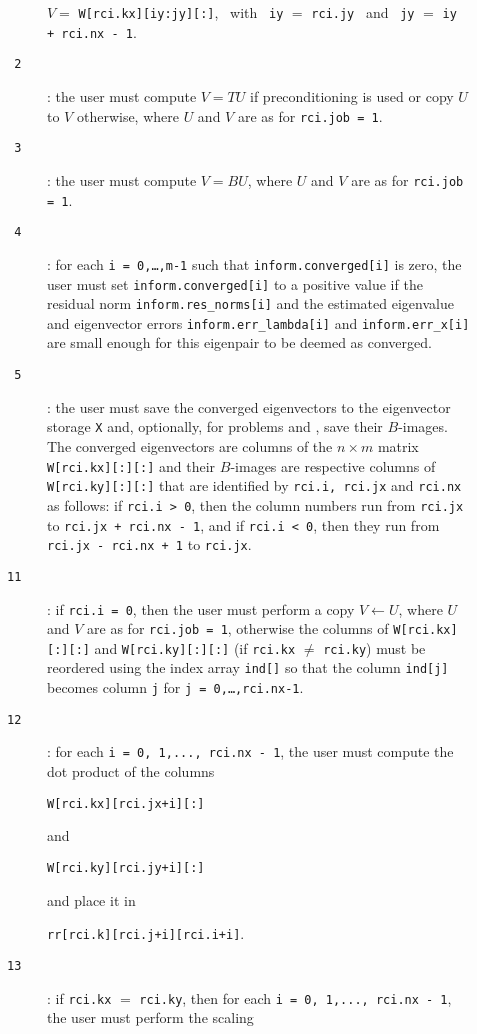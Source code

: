 \begin{description}
\begin{description}
\hspace{8mm}
$V=$ {\tt W[rci.kx][iy:jy][:]},
~with~ {\tt iy} $=$ {\tt rci.jy} 
~and~
{\tt jy} $=$ {\tt iy + rci.nx - 1}.
%
\item[\texttt{~2}]: the user must
compute $V = T U$ if preconditioning is used
or copy $U$ to $V$ otherwise,
where $U$ and $V$ are as for {\tt rci.job = 1}.
%
\item[\texttt{~3}]:
the user must compute $V = B U$,
where $U$ and $V$ are as for {\tt rci.job = 1}.
%
\item[\texttt{~4}]:
for each {\tt i = 0,\ldots,m-1}
such that {\tt inform.converged[i]} is zero,
the user must set {\tt inform.converged[i]}
to a positive value if the residual norm
{\tt inform.res\_norms[i]} and
the estimated eigenvalue and eigenvector errors
{\tt inform.err\_lambda[i]} and
{\tt inform.err\_x[i]} are small enough
for this eigenpair to be deemed as converged.
%
\item[\texttt{~5}]: the user must save the converged eigenvectors
to the eigenvector storage {\tt X}
and, optionally, 
for problems  and ,
save their $B$-images.
The converged eigenvectors are columns of the $n\times m$ matrix
{\tt W[rci.kx][:][:]} and their $B$-images are respective columns of
{\tt W[rci.ky][:][:]}
that are identified by
{\tt rci.i, rci.jx} and {\tt rci.nx}
as follows:
if {\tt rci.i > 0}, then the column numbers
run from {\tt rci.jx} to {\tt rci.jx + rci.nx - 1},
and if {\tt rci.i < 0}, then they run
from {\tt rci.jx - rci.nx + 1} to {\tt rci.jx}.
%
\item[\texttt{11}]:
if {\tt rci.i = 0}, then
the user  must perform a copy $V \leftarrow U$, 
where $U$ and $V$ are as for {\tt rci.job = 1},
otherwise the columns of {\tt W[rci.kx][:][:]}
and {\tt W[rci.ky][:][:]}
(if {\tt rci.kx} $\not=$ {\tt rci.ky}) 
must be reordered using
the index array {\tt ind[]} so that
the column {\tt ind[j]} becomes column {\tt j}
for {\tt j = 0,\ldots,rci.nx-1}.
%
\item[\texttt{12}]:
for each
{\tt i = 0, 1,..., rci.nx - 1}, 
the user must compute the dot product of
the columns 

\hspace{8mm}
{\tt W[rci.kx][rci.jx+i][:]} 

and

\hspace{8mm}
{\tt W[rci.ky][rci.jy+i][:]}

and place it in 

\hspace{8mm}
{\tt rr[rci.k][rci.j+i][rci.i+i]}.
%
\item[\texttt{13}]: 
if {\tt rci.kx} $=$ {\tt rci.ky}, then
for each
{\tt i = 0, 1,..., rci.nx - 1}, 
the user must perform the scaling


\end{description}
\end{description}
